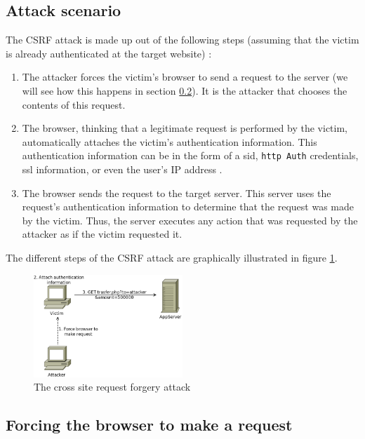 \subsection{Attack scenario}

The CSRF attack is made up out of the following steps (assuming that the victim is already authenticated at the target website) \cite{Schreiber2004}:

\begin{enumerate}
	\item The attacker forces the victim's browser to send a request to the server (we will see how this happens in section \ref{forcing-request}). It is the attacker that chooses the contents of this request.
	\item The browser, thinking that a legitimate request is performed by the victim, automatically attaches the victim's authentication information. This authentication information can be in the form of a \gls{sid}, \texttt{\gls{http} Auth} credentials, \gls{ssl} information, or even the user's IP address \cite{Johns2006b,Zeller2008}.
	\item The browser sends the request to the target server. This server uses the request's authentication information to determine that the request was made by the victim. Thus, the server executes any action that was requested by the attacker as if the victim requested it.
\end{enumerate}

The different steps of the CSRF attack are graphically illustrated in figure \ref{fig:csrf}.

\begin{figure}[ht]
	\centering
	\includegraphics[width=0.50\textwidth]{img/csrf.png}
	\caption{The cross site request forgery attack}
	\label{fig:csrf}
\end{figure}

\subsection{Forcing the browser to make a request}\label{forcing-request}

